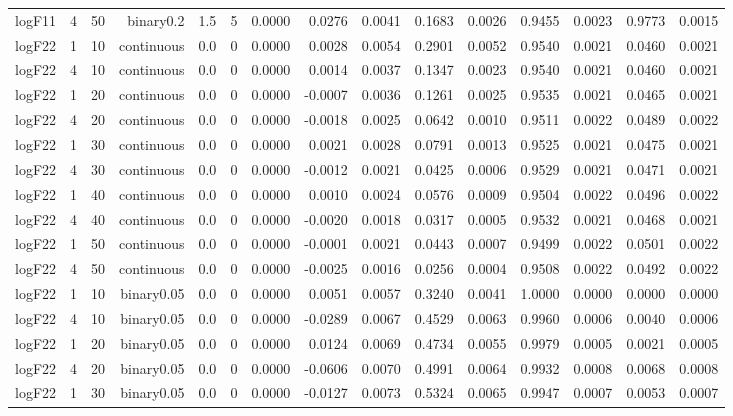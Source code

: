 \begin{longtable}{rrrrrrrrrrrrrrr}
  logF11 & 4 & 50 & binary0.2 & 1.5 & 5 & 0.0000 & 0.0276 & 0.0041 & 0.1683 & 0.0026 & 0.9455 & 0.0023 & 0.9773 & 0.0015 \\ 
  logF22 & 1 & 10 & continuous & 0.0 & 0 & 0.0000 & 0.0028 & 0.0054 & 0.2901 & 0.0052 & 0.9540 & 0.0021 & 0.0460 & 0.0021 \\ 
  logF22 & 4 & 10 & continuous & 0.0 & 0 & 0.0000 & 0.0014 & 0.0037 & 0.1347 & 0.0023 & 0.9540 & 0.0021 & 0.0460 & 0.0021 \\ 
  logF22 & 1 & 20 & continuous & 0.0 & 0 & 0.0000 & -0.0007 & 0.0036 & 0.1261 & 0.0025 & 0.9535 & 0.0021 & 0.0465 & 0.0021 \\ 
  logF22 & 4 & 20 & continuous & 0.0 & 0 & 0.0000 & -0.0018 & 0.0025 & 0.0642 & 0.0010 & 0.9511 & 0.0022 & 0.0489 & 0.0022 \\ 
  logF22 & 1 & 30 & continuous & 0.0 & 0 & 0.0000 & 0.0021 & 0.0028 & 0.0791 & 0.0013 & 0.9525 & 0.0021 & 0.0475 & 0.0021 \\ 
  logF22 & 4 & 30 & continuous & 0.0 & 0 & 0.0000 & -0.0012 & 0.0021 & 0.0425 & 0.0006 & 0.9529 & 0.0021 & 0.0471 & 0.0021 \\ 
  logF22 & 1 & 40 & continuous & 0.0 & 0 & 0.0000 & 0.0010 & 0.0024 & 0.0576 & 0.0009 & 0.9504 & 0.0022 & 0.0496 & 0.0022 \\ 
  logF22 & 4 & 40 & continuous & 0.0 & 0 & 0.0000 & -0.0020 & 0.0018 & 0.0317 & 0.0005 & 0.9532 & 0.0021 & 0.0468 & 0.0021 \\ 
  logF22 & 1 & 50 & continuous & 0.0 & 0 & 0.0000 & -0.0001 & 0.0021 & 0.0443 & 0.0007 & 0.9499 & 0.0022 & 0.0501 & 0.0022 \\ 
  logF22 & 4 & 50 & continuous & 0.0 & 0 & 0.0000 & -0.0025 & 0.0016 & 0.0256 & 0.0004 & 0.9508 & 0.0022 & 0.0492 & 0.0022 \\ 
  logF22 & 1 & 10 & binary0.05 & 0.0 & 0 & 0.0000 & 0.0051 & 0.0057 & 0.3240 & 0.0041 & 1.0000 & 0.0000 & 0.0000 & 0.0000 \\ 
  logF22 & 4 & 10 & binary0.05 & 0.0 & 0 & 0.0000 & -0.0289 & 0.0067 & 0.4529 & 0.0063 & 0.9960 & 0.0006 & 0.0040 & 0.0006 \\ 
  logF22 & 1 & 20 & binary0.05 & 0.0 & 0 & 0.0000 & 0.0124 & 0.0069 & 0.4734 & 0.0055 & 0.9979 & 0.0005 & 0.0021 & 0.0005 \\ 
  logF22 & 4 & 20 & binary0.05 & 0.0 & 0 & 0.0000 & -0.0606 & 0.0070 & 0.4991 & 0.0064 & 0.9932 & 0.0008 & 0.0068 & 0.0008 \\ 
  logF22 & 1 & 30 & binary0.05 & 0.0 & 0 & 0.0000 & -0.0127 & 0.0073 & 0.5324 & 0.0065 & 0.9947 & 0.0007 & 0.0053 & 0.0007 \\ 

\end{longtable}
